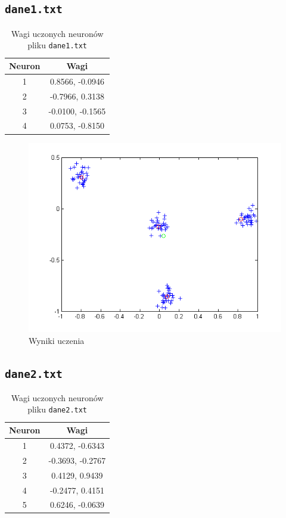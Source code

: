 \documentclass[pointlessnumbers, abstracton, headsepline, a4paper]{scrartcl}
\begin{document}
\subsection{\texttt{dane1.txt}}

\begin{table}[h]
\centering
\begin{tabular}[t]{c|c}
Neuron & Wagi \\
\hline
1 & 0.8566,  -0.0946 \\
2 &-0.7966,   0.3138 \\
3 &-0.0100,  -0.1565 \\
4 & 0.0753,  -0.8150 \\
\end{tabular}
\caption{\label{tab:xor}Wagi uczonych neuronów pliku \texttt{dane1.txt}}
\end{table}

\begin{figure}[!h]
\centering
\includegraphics[scale=0.8]{src/dane1.png}\caption{\label{fig:dane1}Wyniki uczenia}
\end{figure}

\clearpage
\subsection{\texttt{dane2.txt}}

\begin{table}[h]
\centering
\begin{tabular}[t]{c|c}
Neuron & Wagi \\
\hline
1&  0.4372,  -0.6343 \\
2& -0.3693,  -0.2767 \\
3&  0.4129,   0.9439 \\
4& -0.2477,   0.4151 \\
5&  0.6246,  -0.0639 \\
\end{tabular}
\caption{\label{tab:xor}Wagi uczonych neuronów pliku \texttt{dane2.txt}}
\end{table}
\end{document}
